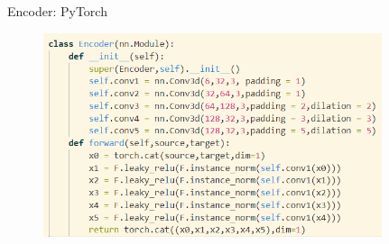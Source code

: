 \documentclass{beamer}
\begin{document}
\begin{frame}{Encoder: PyTorch}
    \begin{figure}
        \centering
        \includegraphics[height=6cm]{encoder.png}
        \label{fig:encoder}
    \end{figure}
\end{frame}
\end{document}
